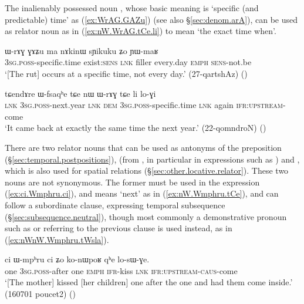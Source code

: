 The inalienably possessed noun , whose basic meaning is `specific (and predictable) time' as (\ref{ex:WrAG.GAZu}) (see also §\ref{sec:denom.arA}), can be used as relator noun as in (\ref{ex:nW.WrAG.tCe.li}) to mean `the exact time when'.

\begin{exe}
\ex \label{ex:WrAG.GAZu}
\gll ɯ-rɤɣ ɣɤʑu ma nɤkinɯ sɲikuku ʑo ɲɯ-maʁ \\
\textsc{3sg}.\textsc{poss}-specific.time exist:\textsc{sens} \textsc{lnk} filler every.day \textsc{emph} \textsc{sens}-not.be \\
\glt `[The rut] occurs at a specific time, not every day.' (27-qartshAz) ()
\end{exe}

\begin{exe}
\ex \label{ex:nW.WrAG.tCe.li}
\gll tɕendɤre ɯ-fsaqʰe tɕe nɯ ɯ-rɤɣ tɕe li lo-ɣi \\
\textsc{lnk} \textsc{3sg}.\textsc{poss}-next.year \textsc{lnk} \textsc{dem}  \textsc{3sg}.\textsc{poss}-specific.time \textsc{lnk} again \textsc{ifr}:\textsc{upstream}-come \\
\glt `It came back at exactly the same time the next year.' (22-qomndroN) ()
\end{exe}


There are two relator nouns that can be used as antonyms of the preposition  (§\ref{sec:temporal.postpositions}),   (from , in particular in expressions such as ) and , which is also used for spatial relations (§\ref{sec:other.locative.relator}). These two nouns are not synonymous. The former must be used in the expression  (\ref{ex:ci.Wmphru.ci}), and means `next' as in (\ref{ex:nW.Wmphru.tCe}), and can follow a subordinate clause, expressing temporal subsequence (§\ref{sec:subsequence.neutral}), though most commonly a demonstrative pronoun such as  or  referring to the previous clause is used instead, as in (\ref{ex:nWnW.Wmphru.tWsla}).

\begin{exe}
\ex \label{ex:ci.Wmphru.ci}
 \gll ci ɯ-mpʰru ci ʑo ko-nɯpoʁ qʰe lo-sɯ-ɣe. \\
 one \textsc{3sg}.\textsc{poss}-after one \textsc{emph} \textsc{ifr}-kiss \textsc{lnk} \textsc{ifr}:\textsc{upstream}-\textsc{caus}-come  \\
\glt `[The mother] kissed [her children] one after the one and had them come inside.' (160701 poucet2) ()
\end{exe}


